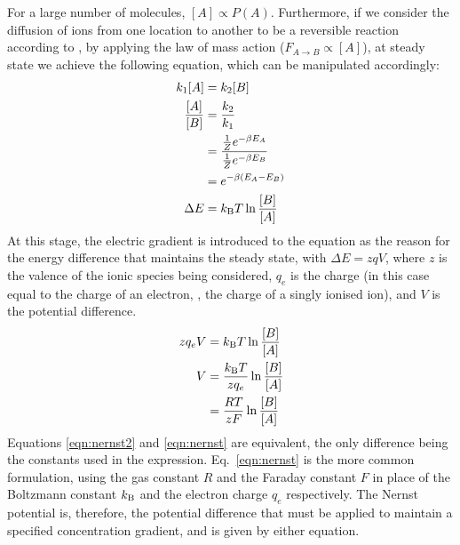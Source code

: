 \documentclass[../thesis-main.tex]{subfiles}
\begin{document}
 For a large number of molecules, $[A] \propto P(A)$. Furthermore, if we consider the diffusion of ions from one location to another to be a reversible reaction according to , by applying the law of mass action ($F_{A\rightarrow B} \propto [A]$), at steady state we achieve the following equation, which can be manipulated accordingly:
 \begin{align}
  k_1[A]		& = k_2[B] \\
  \frac{[A]}{[B]}	& = \frac{k_2}{k_1} \\
			& = \frac{\frac{1}{Z}e^{-\beta E_A}}{\frac{1}{Z}e^{-\beta E_B}} \\
			& = e^{-\beta(E_A-E_B)} \\
  \Delta E		& = k_\textnormal{B}T\ln\frac{[B]}{[A]}
 \end{align}
 At this stage, the electric gradient is introduced to the equation as the reason for the energy difference that maintains the steady state, with $\Delta E = zqV$, where $z$ is the valence of the ionic species being considered, $q_e$ is the charge (in this case equal to the charge of an electron, \idest, the charge of a singly ionised ion), and $V$ is the potential difference.
 \begin{align}
  zq_eV	& = k_\textnormal{B}T\ln\frac{[B]}{[A]} \\
  V	& = \frac{k_\textnormal{B}T}{zq_e}\ln\frac{[B]}{[A]} 	\label{eqn:nernst2} \\
	& = \frac{RT}{zF}\ln\frac{[B]}{[A]} 			\label{eqn:nernst} \\
 \end{align}
 Equations \ref{eqn:nernst2} and \ref{eqn:nernst} are equivalent, the only difference being the constants used in the expression. Eq.~\ref{eqn:nernst} is the more common formulation, using the gas constant $R$ and the Faraday constant $F$ in place of the Boltzmann constant $k_\textnormal{B}$ and the electron charge $q_e$ respectively. The Nernst potential is, therefore, the potential difference that must be applied to maintain a specified concentration gradient, and is given by either equation.
\end{document}
